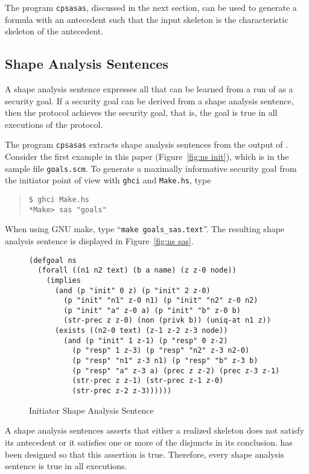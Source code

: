 \documentclass[12pt]{article}
\begin{document}
The program \texttt{cpsasas}, discussed in the next section, can be
used to generate a formula with an antecedent such that the input
skeleton is the characteristic skeleton of the antecedent.

\subsection{Shape Analysis Sentences}\label{sec:sas}

A shape analysis sentence expresses all that can be learned from a run
of {\cpsa} as a security goal.  If a security goal can be derived from
a shape analysis sentence, then the protocol achieves the security
goal, that is, the goal is true in all executions of the protocol.

The program \texttt{cpsasas} extracts shape analysis sentences from
the output of {\cpsa}.  Consider the first example in this paper
(Figure~\ref{fig:ns init}), which is in the sample file
\texttt{goals.scm}.  To generate a maximally informative security goal
from the initiator point of view with \texttt{ghci} and
\texttt{Make.hs}, type
\begin{quote}
\begin{verbatim}
$ ghci Make.hs
*Make> sas "goals"
\end{verbatim}
\end{quote}
When using GNU make, type ``\texttt{make goals\_sas.text}''.  The
resulting shape analysis sentence is displayed in Figure~\ref{fig:ns
  sas}.

\begin{figure}
\begin{verbatim}
(defgoal ns
  (forall ((n1 n2 text) (b a name) (z z-0 node))
    (implies
      (and (p "init" 0 z) (p "init" 2 z-0)
        (p "init" "n1" z-0 n1) (p "init" "n2" z-0 n2)
        (p "init" "a" z-0 a) (p "init" "b" z-0 b)
        (str-prec z z-0) (non (privk b)) (uniq-at n1 z))
      (exists ((n2-0 text) (z-1 z-2 z-3 node))
        (and (p "init" 1 z-1) (p "resp" 0 z-2)
          (p "resp" 1 z-3) (p "resp" "n2" z-3 n2-0)
          (p "resp" "n1" z-3 n1) (p "resp" "b" z-3 b)
          (p "resp" "a" z-3 a) (prec z z-2) (prec z-3 z-1)
          (str-prec z z-1) (str-prec z-1 z-0)
          (str-prec z-2 z-3))))))
\end{verbatim}
\caption{Initiator Shape Analysis Sentence}\label{fig:ns sas}
\end{figure}

A shape analysis sentences asserts that either a realized skeleton
does not satisfy its antecedent or it satisfies one or more of the
disjuncts in its conclusion.  {\cpsa} has been designed so that this
assertion is true.  Therefore, every shape analysis sentence is true
in all executions.
\end{document}
